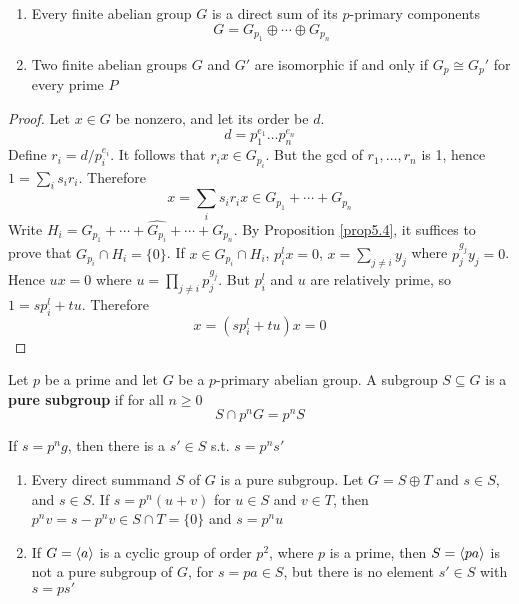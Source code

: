 \documentclass[11pt]{article}
\begin{document}
\begin{theorem}
\label{nthm4.15}
\begin{enumerate}
\item Every finite abelian group \(G\) is a direct sum of its \(p\)-primary
components
\begin{equation*}
G=G_{p_1}\oplus\cdots\oplus G_{p_n}
\end{equation*}
\item Two finite abelian groups \(G\) and \(G'\) are isomorphic if and only if
\(G_p\cong G_p'\) for every prime \(P\)
\end{enumerate}
\end{theorem}

\begin{proof}
Let \(x\in G\) be nonzero, and let its order be \(d\).
\begin{equation*}
d=p_1^{e_1}\dots p_n^{e_n}
\end{equation*}
Define \(r_i=d/p_i^{e_i}\). It follows that \(r_ix\in G_{p_i}\). But the gcd
of \(r_1,\dots,r_n\) is 1, hence \(1=\sum_is_ir_i\). Therefore
\begin{equation*}
x=\displaystyle\sum_{i}s_ir_ix\in G_{p_1}+\cdots+G_{p_n}
\end{equation*}
Write \(H_i=G_{p_1}+\cdots+\widehat{G_{p_i}}+\cdots+G_{p_n}\). By
Proposition \ref{prop5.4}, it suffices to prove that 
\(G_{p_i}\cap H_i=\{0\}\). If \(x\in G_{p_i}\cap H_i\), \(p_i^lx=0\), 
\(x=\sum_{j\neq i}y_j\) where \(p_j^{g_j}y_j=0\). Hence 
\(ux=0\) where \(u=\prod_{j\neq i}p_j^{g_j}\). But \(p_i^l\) and \(u\) are
relatively prime, so \(1=sp_i^l+tu\). Therefore
\begin{equation*}
x=(sp_i^l+tu)x=0
\end{equation*}
\end{proof}

\begin{definition}[]
Let \(p\) be a prime and let \(G\) be a \(p\)-primary abelian group. A subgroup
\(S\subseteq G\) is a \textbf{pure subgroup} if for all \(n\ge 0\)
\begin{equation*}
S\cap p^nG=p^nS
\end{equation*}
\end{definition}

If \(s=p^ng\), then there is a \(s'\in S\) s.t. \(s=p^ns'\)

\begin{examplle}[]
\label{nexample4.16}
\begin{enumerate}
\item Every direct summand \(S\) of \(G\) is a pure subgroup. Let 
\(G=S\oplus T\) and \(s\in S\), and \(s\in S\). If \(s=p^n(u+v)\) for
\(u\in S\) and \(v\in T\), then \(p^nv=s-p^nv\in S\cap T=\{0\}\) and \(s=p^nu\)
\item If \(G=\langle a\rangle\) is a cyclic group of order \(p^2\), where \(p\) is a
prime, then \(S=\langle pa\rangle\) is not a pure subgroup of \(G\), for 
\(s=pa\in S\), but there is no element \(s'\in S\) with \(s=ps'\)
\end{enumerate}
\end{examplle}
\end{document}
